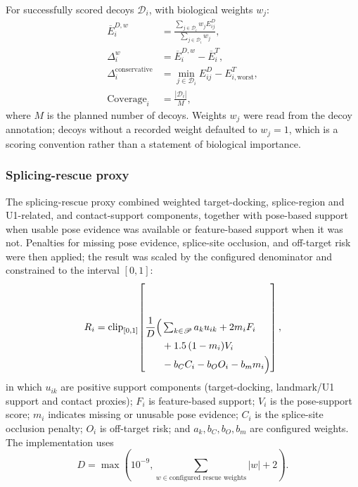 \documentclass[journal]{IEEEtran}
\begin{document}
For successfully scored decoys $\mathscr{D}_{i}$, with biological
weights $w_{j}$:
\begin{equation}
\begin{aligned}
\overline{E}_{i}^{D,w} &=
\frac{\displaystyle\sum_{j \in \mathscr{D}_{i}} w_{j} E_{ij}^{D}}
     {\displaystyle\sum_{j \in \mathscr{D}_{i}} w_{j}},\\[4pt]
\Delta_{i}^{w} &= \overline{E}_{i}^{D,w} - \overline{E}_{i}^{T},\\[4pt]
\Delta_{i}^{\mathrm{conservative}} &=
\min_{j \in \mathscr{D}_{i}} E_{ij}^{D} - E_{i,\mathrm{worst}}^{T},\\[4pt]
\mathrm{Coverage}_{i} &= \frac{|\mathscr{D}_{i}|}{M},
\end{aligned}
\label{eq:selectivity}
\end{equation}
where $M$ is the planned number of decoys. Weights $w_{j}$ were read
from the decoy annotation; decoys without a recorded weight defaulted to
$w_{j} = 1$, which is a scoring convention rather than a statement of
biological importance.

\subsubsection{Splicing-rescue proxy}
The splicing-rescue proxy combined weighted target-docking,
splice-region and U1-related, and contact-support components, together
with pose-based support when usable pose evidence was available or
feature-based support when it was not. Penalties for missing pose
evidence, splice-site occlusion, and off-target risk were then applied;
the result was scaled by the configured denominator and constrained to
the interval $[0,1]$:
\begin{equation}
R_{i} = \mathrm{clip}_{[0,1]}\!\left[\frac{1}{D}
\begin{aligned}[t]
 \Bigl(&\textstyle\sum_{k \in \mathscr{P}} a_{k} u_{ik}
 + 2 m_{i} F_{i}\\
 &+ 1.5\,(1 - m_{i}) V_{i}\\
 &- b_{C} C_{i} - b_{O} O_{i} - b_{m} m_{i} \Bigr)
\end{aligned}
\right],
\label{eq:rescue}
\end{equation}
in which $u_{ik}$ are positive support components (target-docking,
landmark/U1 support and contact proxies); $F_{i}$ is feature-based
support; $V_{i}$ is the pose-support score; $m_{i}$ indicates missing or
unusable pose evidence; $C_{i}$ is the splice-site occlusion penalty;
$O_{i}$ is off-target risk; and $a_{k}, b_{C}, b_{O}, b_{m}$ are
configured weights. The implementation uses
\begin{equation*}
D = \max\!\left(10^{-9},
\sum_{w \in \text{configured rescue weights}} |w| + 2 \right).
\end{equation*}
\end{document}
